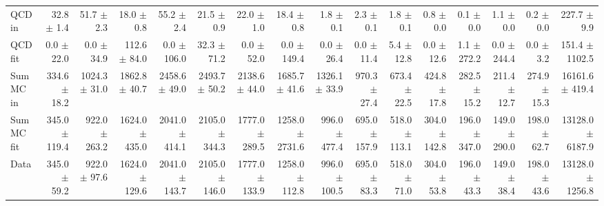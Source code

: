 \begin{table}[htbp]
{\begin{tabular}{lrrrrrrrrrrrrrrr}
\hline
QCD in & 32.8 $\pm$ 1.4 & 51.7 $\pm$ 2.3 & 18.0 $\pm$ 0.8 & 55.2 $\pm$ 2.4 & 21.5 $\pm$ 0.9 & 22.0 $\pm$ 1.0 & 18.4 $\pm$ 0.8 & 1.8 $\pm$ 0.1 & 2.3 $\pm$ 0.1 & 1.8 $\pm$ 0.1 & 0.8 $\pm$ 0.0 & 0.1 $\pm$ 0.0 & 1.1 $\pm$ 0.0 & 0.2 $\pm$ 0.0 & 227.7 $\pm$ 9.9 \\
QCD fit & 0.0 $\pm$ 22.0 & 0.0 $\pm$ 34.9 & 112.6 $\pm$ 84.0 & 0.0 $\pm$ 106.0 & 32.3 $\pm$ 71.2 & 0.0 $\pm$ 52.0 & 0.0 $\pm$ 149.4 & 0.0 $\pm$ 26.4 & 0.0 $\pm$ 11.4 & 5.4 $\pm$ 12.8 & 0.0 $\pm$ 12.6 & 1.1 $\pm$ 272.2 & 0.0 $\pm$ 244.4 & 0.0 $\pm$ 3.2 & 151.4 $\pm$ 1102.5 \\
\hline
Sum MC in & 334.6 $\pm$ 18.2 & 1024.3 $\pm$ 31.0 & 1862.8 $\pm$ 40.7 & 2458.6 $\pm$ 49.0 & 2493.7 $\pm$ 50.2 & 2138.6 $\pm$ 44.0 & 1685.7 $\pm$ 41.6 & 1326.1 $\pm$ 33.9 & 970.3 $\pm$ 27.4 & 673.4 $\pm$ 22.5 & 424.8 $\pm$ 17.8 & 282.5 $\pm$ 15.2 & 211.4 $\pm$ 12.7 & 274.9 $\pm$ 15.3& 16161.6 $\pm$ 419.4 \\
Sum MC fit & 345.0 $\pm$ 119.4 & 922.0 $\pm$ 263.2 & 1624.0 $\pm$ 435.0 & 2041.0 $\pm$ 414.1 & 2105.0 $\pm$ 344.3 & 1777.0 $\pm$ 289.5 & 1258.0 $\pm$ 2731.6 & 996.0 $\pm$ 477.4 & 695.0 $\pm$ 157.9 & 518.0 $\pm$ 113.1 & 304.0 $\pm$ 142.8 & 196.0 $\pm$ 347.0 & 149.0 $\pm$ 290.0 & 198.0 $\pm$ 62.7 & 13128.0 $\pm$ 6187.9 \\
\hline
Data & 345.0 $\pm$ 59.2 & 922.0 $\pm$ 97.6 & 1624.0 $\pm$ 129.6 & 2041.0 $\pm$ 143.7 & 2105.0 $\pm$ 146.0 & 1777.0 $\pm$ 133.9 & 1258.0 $\pm$ 112.8 & 996.0 $\pm$ 100.5 & 695.0 $\pm$ 83.3 & 518.0 $\pm$ 71.0 & 304.0 $\pm$ 53.8 & 196.0 $\pm$ 43.3 & 149.0 $\pm$ 38.4 & 198.0 $\pm$ 43.6 & 13128.0 $\pm$ 1256.8 \\
\hline
\end{tabular}
}
\end{table}
